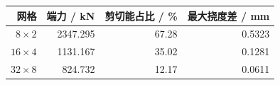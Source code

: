 \begin{tabular}{rrrr}\toprule 网格 & 端力 / kN & 剪切能占比 / \% & 最大挠度差 / mm\\\midrule
$8\times2$ & 2347.295 & 67.28 & 0.5323\\
$16\times4$ & 1131.167 & 35.02 & 0.1281\\
$32\times8$ & 824.732 & 12.17 & 0.0611\\
\bottomrule\end{tabular}
